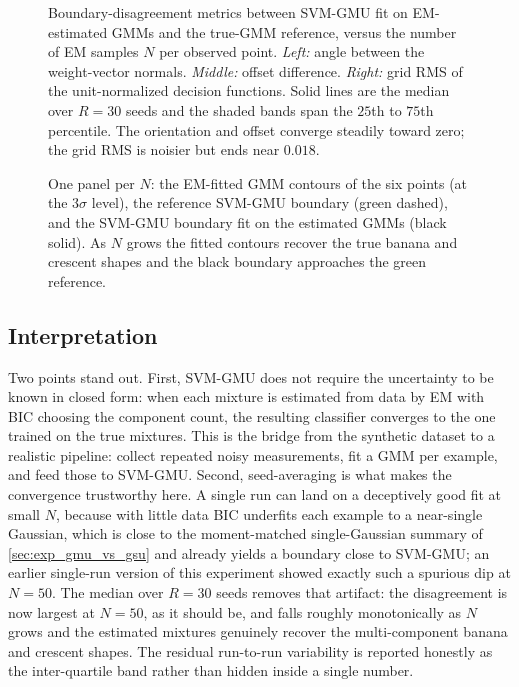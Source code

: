 \documentclass[11pt, letterpaper]{article}
\begin{document}
\begin{figure}[H]
    \centering
    \resizebox{\textwidth}{!}{}
    \caption{Boundary-disagreement metrics between SVM-GMU fit on EM-estimated GMMs and the true-GMM reference, versus the number of EM samples $N$ per observed point. \emph{Left:} angle between the weight-vector normals. \emph{Middle:} offset difference. \emph{Right:} grid RMS of the unit-normalized decision functions. Solid lines are the median over $R = 30$ seeds and the shaded bands span the $25$th to $75$th percentile. The orientation and offset converge steadily toward zero; the grid RMS is noisier but ends near $0.018$.}
    \label{fig:exp_em_metrics}
\end{figure}

\begin{figure}[htbp]
    \centering
    \resizebox{!}{0.93\textheight}{}
    \caption{One panel per $N$: the EM-fitted GMM contours of the six points (at the $3\sigma$ level), the reference SVM-GMU boundary (green dashed), and the SVM-GMU boundary fit on the estimated GMMs (black solid). As $N$ grows the fitted contours recover the true banana and crescent shapes and the black boundary approaches the green reference.}
    \label{fig:exp_em_panels}
\end{figure}

\subsection{Interpretation}

Two points stand out. First, SVM-GMU does not require the uncertainty to be known in closed form: when each mixture is estimated from data by EM with BIC choosing the component count, the resulting classifier converges to the one trained on the true mixtures. This is the bridge from the synthetic dataset to a realistic pipeline: collect repeated noisy measurements, fit a GMM per example, and feed those to SVM-GMU. Second, seed-averaging is what makes the convergence trustworthy here. A single run can land on a deceptively good fit at small $N$, because with little data BIC underfits each example to a near-single Gaussian, which is close to the moment-matched single-Gaussian summary of \cref{sec:exp_gmu_vs_gsu} and already yields a boundary close to SVM-GMU; an earlier single-run version of this experiment showed exactly such a spurious dip at $N = 50$. The median over $R = 30$ seeds removes that artifact: the disagreement is now largest at $N = 50$, as it should be, and falls roughly monotonically as $N$ grows and the estimated mixtures genuinely recover the multi-component banana and crescent shapes. The residual run-to-run variability is reported honestly as the inter-quartile band rather than hidden inside a single number.
\end{document}
